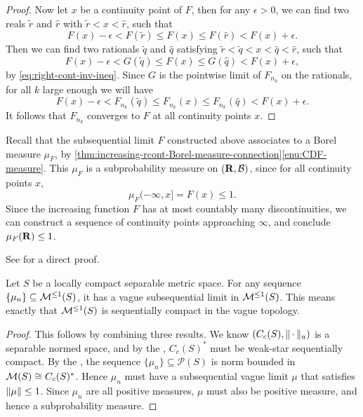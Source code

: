 \begin{proof}
    Now let $x$ be a continuity point of $F$, then for any $\epsilon > 0$, we can find two reals $\tilde r$ and $\hat r$ with $\tilde r <  x < \hat r$, such that \[
        F(x) - \epsilon < F(\tilde r) \leq F(x) \leq F(\hat r) < F(x) + \epsilon.
    \] Then we can find two rationals $\tilde q$ and $\hat q$ satisfying $\tilde r < \tilde q < x < \hat q < \hat r$, such that \[
        F(x) - \epsilon < G(\tilde q) \leq F(x) \leq G(\hat q) < F(x) + \epsilon,
    \] by \eqref{eq:right-cont-inv-ineq}. Since $G$ is the pointwise limit of $F_{n_k}$ on the rationals, for all $k$ large enough we will have \[
        F(x) - \epsilon < F_{n_k}(\tilde q) \leq F_{n_k}(x) \leq F_{n_k}(\hat q) < F(x) + \epsilon.
    \] It follows that $F_{n_k}$ converges to $F$ at all continuity points $x$.
\end{proof}

Recall that the subsequential limit $F$ constructed above associates to a Borel measure $\mu_F$, by \cref{thm:increasing-rcont-Borel-measure-connection}\ref{enu:CDF-measure}. This $\mu_F$ is a subprobability measure on $(\mathbf{R},\mathcal{B})$, since for all continuity points $x$, \[\mu_F(-\infty,x] = F(x)\leq 1.\] Since the increasing function $F$ has at most countably many discontinuities, we can construct a sequence of continuity points approaching $\infty$, and conclude $\mu_F(\mathbf{R})\leq 1$.

See {\cite[Theorem~21.18, Corollary~21.19]{Schilling_2017}} for a direct proof.

\begin{namedthm} \label{thm:Helly-selection-LCS}
    Let $S$ be a locally compact separable metric space. For any sequence $\{\mu_n\} \subseteq \mathcal{M}^{\leq 1}(S)$, it has a vague subsequential limit in $\mathcal{M}^{\leq 1}(S)$. This means exactly that $\mathcal{M}^{\leq 1}(S)$ is sequentially compact in the vague topology.
\end{namedthm}
\begin{proof}
    This follows by combining three results. We know $(C_c(S),\lVert \,\cdot\, \rVert_u)$ is a separable normed space, and by the , $C_c(S)^*$ must be weak-star sequentially compact. By the , the sequence $\{\mu_n\} \subseteq \mathcal P(S)$ is norm bounded in $\mathcal{M}(S) \cong C_c(S)^*$. Hence $\mu_n$ must have a subsequential vague limit $\mu$ that satisfies $\lVert \mu \rVert \leq 1$. Since $\mu_n$ are all positive measures, $\mu$ must also be positive measure, and hence a subprobability measure.
\end{proof}

